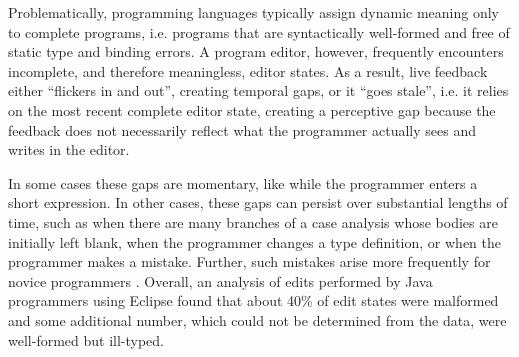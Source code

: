 %
Problematically,
programming languages typically assign dynamic meaning only to {complete programs}, i.e. programs that are syntactically well-formed and free of static type and binding errors. A program editor, however, frequently encounters incomplete, and therefore meaningless, editor states. As a result, live feedback either ``flickers in and out'', creating temporal gaps, or it ``goes stale'', i.e. it relies on the most recent complete editor state, creating a perceptive gap because the feedback does not necessarily reflect what the programmer
%
actually sees and writes in the editor.

In some cases these gaps are momentary, like while the programmer
enters
a short expression. In other cases, these gaps can persist over substantial lengths of time, such as when there are many branches of a case analysis whose bodies are initially left blank, when the programmer changes a type definition, or when the programmer makes a mistake.
%
Further, such mistakes arise more frequently for novice programmers \cite{mccauley2008debugging,fitzgerald2008debugging}.
%
Overall, an analysis of edits performed by Java programmers using Eclipse found that about 40\% of edit states were malformed \cite{popl-paper,6883030} and some additional number, which could not be determined from the data, were well-formed but ill-typed.


